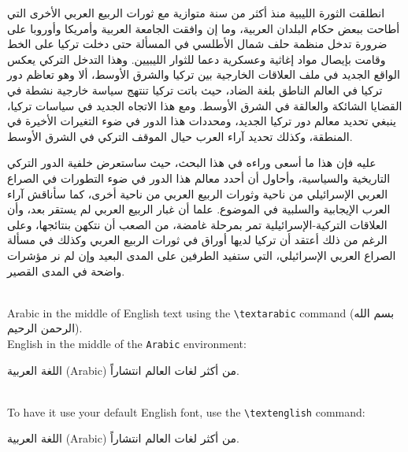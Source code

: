 \documentclass{article}
\begin{document}
\begin{Arabic}


انطلقت الثورة الليبية منذ أكثر من سنة متوازية مع ثورات الربيع العربي الأخرى التي أطاحت ببعض حكام البلدان العربية، وما إن وافقت الجامعة العربية وأمريكا وأوروبا على ضرورة تدخل منظمة حلف شمال الأطلسي في المسألة حتى دخلت تركيا على الخط وقامت بإيصال مواد إغاثية وعسكرية دعما للثوار الليبيين. وهذا التدخل التركي يعكس الواقع الجديد في ملف العلاقات الخارجية بين تركيا والشرق الأوسط، ألا وهو تعاظم دور تركيا في العالم الناطق بلغة الضاد، حيث باتت تركيا تنتهج سياسة خارجية نشطة في القضايا الشائكة والعالقة في الشرق الأوسط. ومع هذا الاتجاه الجديد في سياسات تركيا، ينبغي تحديد معالم دور تركيا الجديد، ومحددات هذا الدور في ضوء التغيرات الأخيرة في المنطقة، وكذلك تحديد آراء العرب حيال الموقف التركي في الشرق الأوسط.

عليه فإن هذا ما أسعى وراءه في هذا البحث، حيث ساستعرض خلفية الدور التركي التاريخية والسياسية، وأحاول أن أحدد معالم هذا الدور في ضوء التطورات في الصراع العربي الإسرائيلي من ناحية وثورات الربيع العربي من ناحية أخرى، كما سأناقش آراء العرب الإيجابية والسلبية في الموضوع. علما أن غبار الربيع العربي لم يستقر بعد، وأن العلاقات التركية-الإسرائيلية تمر بمرحلة غامضة، من الصعب أن نتكهن بنتائجها، وعلى الرغم من ذلك أعتقد أن تركيا لديها أوراق في ثورات الربيع العربي وكذلك في مسألة الصراع العربي الإسرائيلي، التي ستفيد الطرفين على المدى البعيد وإن لم نر مؤشرات واضحة في المدى القصير.

\end{Arabic}
\ \\

Arabic in the middle of English text using the \verb|\textarabic| command (\textarabic{بسم الله الرحمن الرحيم}).
\ \\

English in the middle of the \verb|Arabic| environment:
\ \\

\begin{Arabic}

اللغة العربية (Arabic) من أكثر لغات العالم انتشاراً.

\end{Arabic}
\ \\

To have it use your default English font, use the \verb|\textenglish| command:
\ \\

\begin{Arabic}

اللغة العربية (\textenglish{Arabic}) من أكثر لغات العالم انتشاراً.

\end{Arabic}
\end{document}
